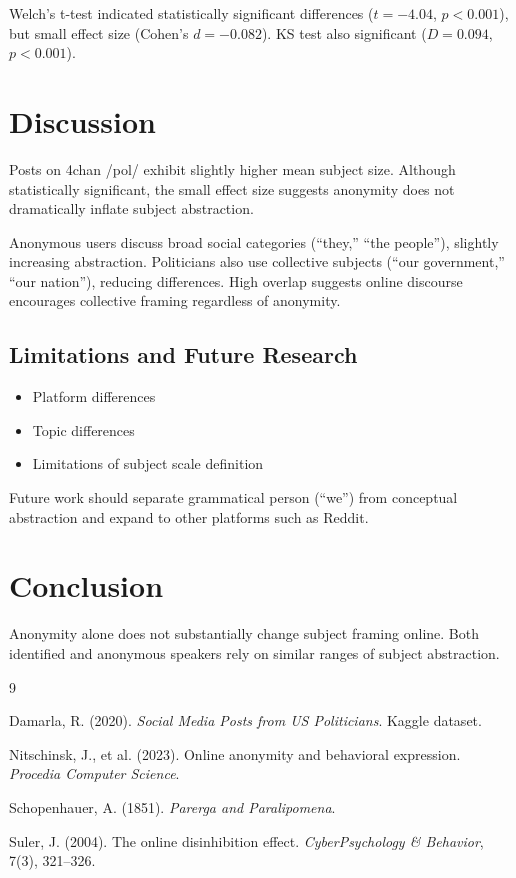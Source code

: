 \documentclass{article}
\begin{document}
Welch's t-test indicated statistically significant differences ($t = -4.04$, $p < 0.001$), 
but small effect size (Cohen's $d = -0.082$). KS test also significant ($D = 0.094$, $p < 0.001$).

\section{Discussion}

Posts on 4chan /pol/ exhibit slightly higher mean subject size. Although statistically significant, the small effect size suggests anonymity does not dramatically inflate subject abstraction.

Anonymous users discuss broad social categories (``they,'' ``the people''), slightly increasing abstraction. Politicians also use collective subjects (``our government,'' ``our nation''), reducing differences. High overlap suggests online discourse encourages collective framing regardless of anonymity.

\subsection{Limitations and Future Research}

\begin{itemize}
\item Platform differences
\item Topic differences
\item Limitations of subject scale definition
\end{itemize}

Future work should separate grammatical person (``we'') from conceptual abstraction and expand to other platforms such as Reddit.

\section{Conclusion}

Anonymity alone does not substantially change subject framing online. Both identified and anonymous speakers rely on similar ranges of subject abstraction.

\begin{thebibliography}{9}

Damarla, R. (2020). \textit{Social Media Posts from US Politicians}. Kaggle dataset.

Nitschinsk, J., et al. (2023). Online anonymity and behavioral expression. \textit{Procedia Computer Science}.

Schopenhauer, A. (1851). \textit{Parerga and Paralipomena}.

Suler, J. (2004). The online disinhibition effect. \textit{CyberPsychology \& Behavior}, 7(3), 321–326.


\end{thebibliography}
\end{document}
